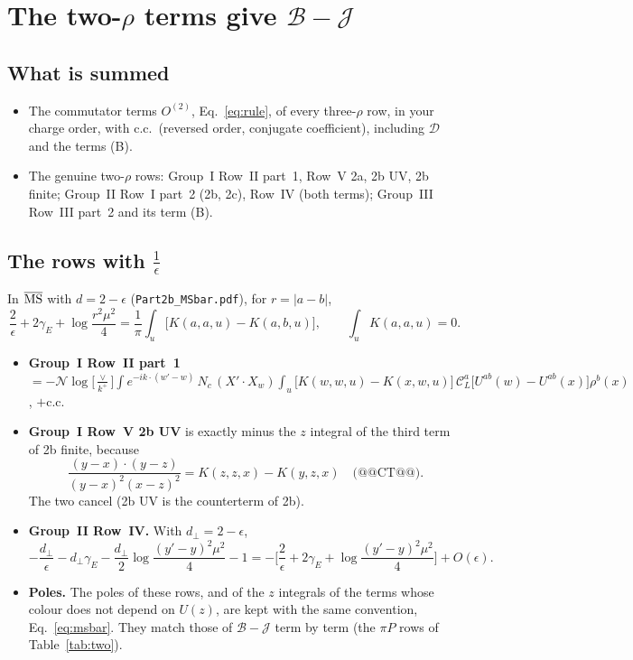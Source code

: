 \documentclass[10pt]{article}
\numberwithin{equation}{section}
\newcommand{\CL}{\mathcal C_L}
\newcommand{\NN}{\mathcal N}
\newcommand{\BB}{\mathcal B}
\newcommand{\JJ}{\mathcal J}
\newcommand{\Lv}{\log\Big[\frac{\vee}{k^+}\Big]}
\newcommand{\phw}{e^{-ik\cdot(w'-w)}}
\begin{document}
\section{The two-\texorpdfstring{$\rho$}{rho} terms give \texorpdfstring{$\mathcal B-\mathcal J$}{B - J}}\label{sec:two}
\subsection{What is summed}
\begin{itemize}
\item The commutator terms $O^{(2)}$, Eq.~\eqref{eq:rule}, of every three-$\rho$ row, in your charge order, with c.c.\ (reversed order, conjugate coefficient), including $\mathcal D$ and the terms (B).
\item The genuine two-$\rho$ rows: Group~I Row~II part~1, Row~V 2a, 2b UV, 2b finite; Group~II Row~I part~2 (2b, 2c), Row~IV (both terms); Group~III Row~III part~2 and its term (B).
\end{itemize}

\subsection{The rows with \texorpdfstring{$\frac1\epsilon$}{1/epsilon}}\label{sec:eps}
In $\overline{\rm MS}$ with $d=2-\epsilon$ (\texttt{Part2b\_MSbar.pdf}), for $r=|a-b|$,
\begin{equation}
\frac2\epsilon+2\gamma_E+\log\frac{r^2\mu^2}{4}=\frac1\pi\int_u\big[K(a,a,u)-K(a,b,u)\big],\qquad \int_uK(a,a,u)=0.
\label{eq:msbar}
\end{equation}
\begin{itemize}
\item \textbf{Group~I Row~II part~1} $=-\NN\Lv\int\phw\,N_c\,(X'\!\cdot X_w)\int_u\big[K(w,w,u)-K(x,w,u)\big]\,\CL^a\big[U^{ab}(w)-U^{ab}(x)\big]\rho^b(x)$, $+$c.c.
\item \textbf{Group~I Row~V 2b UV} is exactly minus the $z$ integral of the third term of 2b finite, because
\begin{equation*}
\frac{(y-x)\cdot(y-z)}{(y-x)^2(x-z)^2}=K(z,z,x)-K(y,z,x)\quad\text{(@@CT@@)}.
\end{equation*}
The two cancel (2b UV is the counterterm of 2b).
\item \textbf{Group~II Row~IV.} With $d_\perp=2-\epsilon$,
\begin{equation*}
-\frac{d_\perp}{\epsilon}-d_\perp\gamma_E-\frac{d_\perp}{2}\log\frac{(y'-y)^2\mu^2}{4}-1=-\Big[\frac2\epsilon+2\gamma_E+\log\frac{(y'-y)^2\mu^2}{4}\Big]+O(\epsilon).
\end{equation*}
\item \textbf{Poles.} The poles of these rows, and of the $z$ integrals of the terms whose colour does not depend on $U(z)$, are kept with the same convention, Eq.~\eqref{eq:msbar}. They match those of $\BB-\JJ$ term by term (the $\pi P$ rows of Table~\ref{tab:two}).
\end{itemize}
\end{document}
